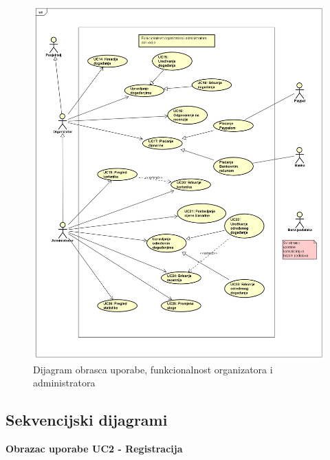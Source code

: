 					\begin{figure}[H]
						\includegraphics[width=\textwidth]{slike/UCD2-1.PNG}
						\caption{Dijagram obrasca uporabe, funkcionalnost organizatora i administratora}
						\label{fig:UCD2}
					\end{figure}
				\eject		
				
			\subsection{Sekvencijski dijagrami}
				
				
				
				
				\textbf{\large Obrazac uporabe UC2 - Registracija}\\
				

